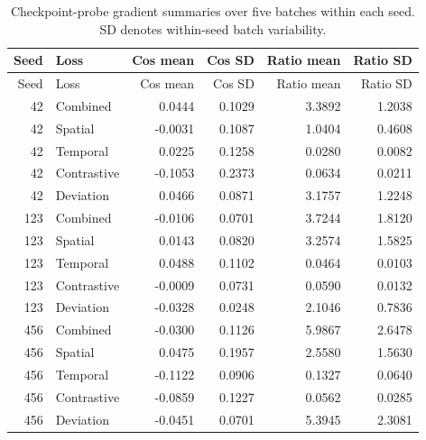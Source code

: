 \documentclass[a4paper,10pt]{article}
\begin{document}
\begingroup\footnotesize\setlength{\tabcolsep}{4pt}
\begin{longtable}{rlrrrr}
\caption{Checkpoint-probe gradient summaries over five batches within each seed. SD denotes within-seed batch variability.}\\
\toprule
Seed & Loss & Cos mean & Cos SD & Ratio mean & Ratio SD \\
\midrule\endfirsthead
\toprule
Seed & Loss & Cos mean & Cos SD & Ratio mean & Ratio SD \\
\midrule\endhead

42 & Combined & 0.0444 & 0.1029 & 3.3892 & 1.2038 \\

42 & Spatial & -0.0031 & 0.1087 & 1.0404 & 0.4608 \\

42 & Temporal & 0.0225 & 0.1258 & 0.0280 & 0.0082 \\

42 & Contrastive & -0.1053 & 0.2373 & 0.0634 & 0.0211 \\

42 & Deviation & 0.0466 & 0.0871 & 3.1757 & 1.2248 \\

123 & Combined & -0.0106 & 0.0701 & 3.7244 & 1.8120 \\

123 & Spatial & 0.0143 & 0.0820 & 3.2574 & 1.5825 \\

123 & Temporal & 0.0488 & 0.1102 & 0.0464 & 0.0103 \\

123 & Contrastive & -0.0009 & 0.0731 & 0.0590 & 0.0132 \\

123 & Deviation & -0.0328 & 0.0248 & 2.1046 & 0.7836 \\

456 & Combined & -0.0300 & 0.1126 & 5.9867 & 2.6478 \\

456 & Spatial & 0.0475 & 0.1957 & 2.5580 & 1.5630 \\

456 & Temporal & -0.1122 & 0.0906 & 0.1327 & 0.0640 \\

456 & Contrastive & -0.0859 & 0.1227 & 0.0562 & 0.0285 \\

456 & Deviation & -0.0451 & 0.0701 & 5.3945 & 2.3081 \\

\bottomrule
\end{longtable}\endgroup
\end{document}
